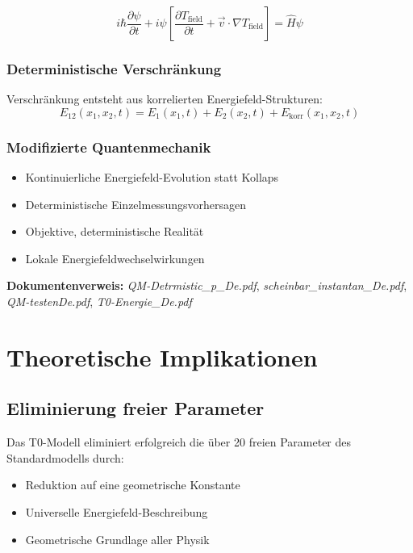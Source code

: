 \documentclass[12pt,a4paper]{article}
\begin{document}
	\begin{equation}
		i\hbar\frac{\partial\psi}{\partial t} + i\psi\left[\frac{\partial T_{\text{field}}}{\partial t} + \vec{v} \cdot \nabla T_{\text{field}}\right] = \hat{H}\psi
	\end{equation}
	
	\subsubsection{Deterministische Verschränkung}
	
	Verschränkung entsteht aus korrelierten Energiefeld-Strukturen:
	\begin{equation}
		E_{12}(x_1,x_2,t) = E_1(x_1,t) + E_2(x_2,t) + E_{\text{korr}}(x_1,x_2,t)
	\end{equation}
	
	\subsubsection{Modifizierte Quantenmechanik}
	
	\begin{itemize}
		\item Kontinuierliche Energiefeld-Evolution statt Kollaps
		\item Deterministische Einzelmessungsvorhersagen
		\item Objektive, deterministische Realität
		\item Lokale Energiefeldwechselwirkungen
	\end{itemize}
	
	\textbf{Dokumentenverweis:} \textit{QM-Detrmistic\_p\_De.pdf}, \textit{scheinbar\_instantan\_De.pdf}, \textit{QM-testenDe.pdf}, \textit{T0-Energie\_De.pdf}
	
	\section{Theoretische Implikationen}
	
	\subsection{Eliminierung freier Parameter}
	
	Das T0-Modell eliminiert erfolgreich die über 20 freien Parameter des Standardmodells durch:
	
	\begin{itemize}
		\item Reduktion auf eine geometrische Konstante
		\item Universelle Energiefeld-Beschreibung
		\item Geometrische Grundlage aller Physik
	\end{itemize}
	
\end{document}
